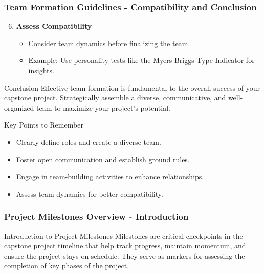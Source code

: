 \documentclass[aspectratio=169]{beamer}
\begin{document}
\begin{frame}[fragile]
    \frametitle{Team Formation Guidelines - Compatibility and Conclusion}
    \begin{enumerate}
        \setcounter{enumi}{5}
        \item \textbf{Assess Compatibility}
            \begin{itemize}
                \item Consider team dynamics before finalizing the team.
                \item Example: Use personality tests like the Myers-Briggs Type Indicator for insights.
            \end{itemize}
    \end{enumerate}

    \begin{block}{Conclusion}
        Effective team formation is fundamental to the overall success of your capstone project.
        Strategically assemble a diverse, communicative, and well-organized team to maximize your project’s potential.
    \end{block}

    \begin{block}{Key Points to Remember}
        \begin{itemize}
            \item Clearly define roles and create a diverse team.
            \item Foster open communication and establish ground rules.
            \item Engage in team-building activities to enhance relationships.
            \item Assess team dynamics for better compatibility.
        \end{itemize}
    \end{block}
\end{frame}

\begin{frame}[fragile]
  \frametitle{Project Milestones Overview - Introduction}
  \begin{block}{Introduction to Project Milestones}
    Milestones are critical checkpoints in the capstone project timeline that help track progress, maintain momentum, and ensure the project stays on schedule. They serve as markers for assessing the completion of key phases of the project.
  \end{block}
\end{frame}
\end{document}
